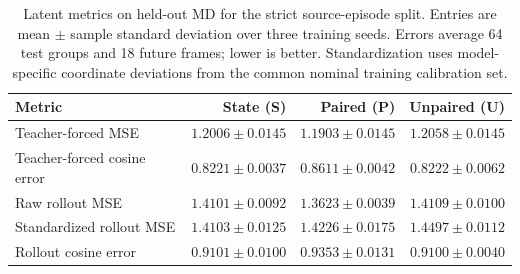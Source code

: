 \begin{table}[t]
\centering
\caption{Latent metrics on held-out MD for the strict source-episode split. Entries are mean $\pm$ sample standard deviation over three training seeds. Errors average 64 test groups and 18 future frames; lower is better. Standardization uses model-specific coordinate deviations from the common nominal training calibration set.}
\label{tab:latent}
\small
\setlength{\tabcolsep}{5pt}
\renewcommand{\arraystretch}{1.12}
\begin{tabular}{lrrr}
\toprule
Metric & State (S) & Paired (P) & Unpaired (U) \\
\midrule
Teacher-forced MSE & $1.2006\pm0.0145$ & $1.1903\pm0.0145$ & $1.2058\pm0.0145$ \\
Teacher-forced cosine error & $0.8221\pm0.0037$ & $0.8611\pm0.0042$ & $0.8222\pm0.0062$ \\
Raw rollout MSE & $1.4101\pm0.0092$ & $1.3623\pm0.0039$ & $1.4109\pm0.0100$ \\
Standardized rollout MSE & $1.4103\pm0.0125$ & $1.4226\pm0.0175$ & $1.4497\pm0.0112$ \\
Rollout cosine error & $0.9101\pm0.0100$ & $0.9353\pm0.0131$ & $0.9100\pm0.0040$ \\
\bottomrule
\end{tabular}
\end{table}

